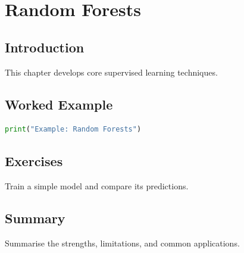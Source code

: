 \chapter{Random Forests}
\label{chap:vol6-9}



\section{Introduction}
This chapter develops core supervised learning techniques.

\section{Worked Example}
\begin{lstlisting}[language=Python]
print("Example: Random Forests")
\end{lstlisting}

\section{Exercises}
\begin{exercise}
Train a simple model and compare its predictions.
\end{exercise}

\section{Summary}
Summarise the strengths, limitations, and common applications.
